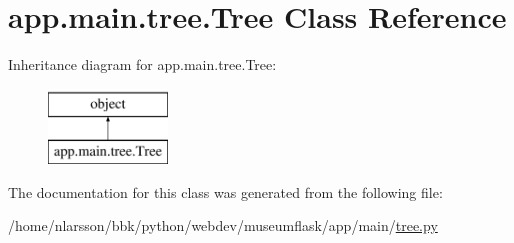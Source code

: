 \hypertarget{classapp_1_1main_1_1tree_1_1Tree}{}\section{app.\+main.\+tree.\+Tree Class Reference}
\label{classapp_1_1main_1_1tree_1_1Tree}
Inheritance diagram for app.\+main.\+tree.\+Tree\+:\begin{figure}[H]
\begin{center}
\leavevmode
\includegraphics[height=2.000000cm]{classapp_1_1main_1_1tree_1_1Tree}
\end{center}
\end{figure}


The documentation for this class was generated from the following file\+:\begin{DoxyCompactItemize}
\item 
/home/nlarsson/bbk/python/webdev/museumflask/app/main/\mbox{\hyperlink{tree_8py}{tree.\+py}}\end{DoxyCompactItemize}
